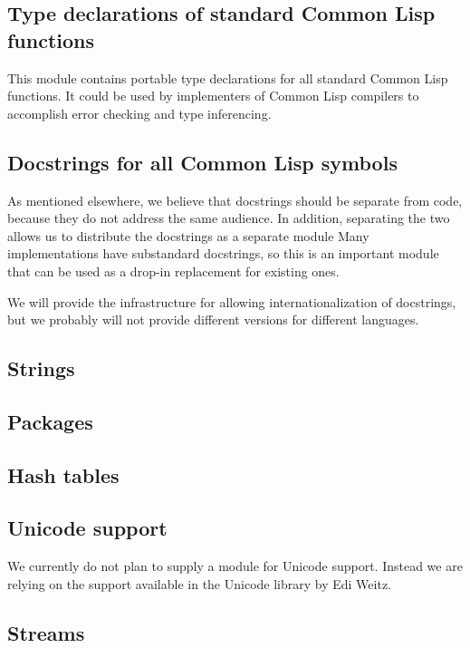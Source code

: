\documentclass{article}
\begin{document}
\subsection{Type declarations of standard Common Lisp functions}

This module contains portable type declarations for all standard
Common Lisp functions.  It could be used by implementers of Common
Lisp compilers to accomplish error checking and type inferencing. 

\subsection{Docstrings for all Common Lisp symbols}

As mentioned elsewhere, we believe that docstrings should be separate
from code, because they do not address the same audience.  In
addition, separating the two allows us to distribute the docstrings as
a separate module Many implementations have substandard docstrings, so
this is an important module that can be used as a drop-in replacement
for existing ones.

We will provide the infrastructure for allowing internationalization
of docstrings, but we probably will not provide different versions for
different languages. 

\subsection{Strings}

\subsection{Packages}

\subsection{Hash tables}

\subsection{Unicode support}

We currently do not plan to supply a module for Unicode support.
Instead we are relying on the support available in the Unicode library
by Edi Weitz.

\subsection{Streams}
\end{document}
